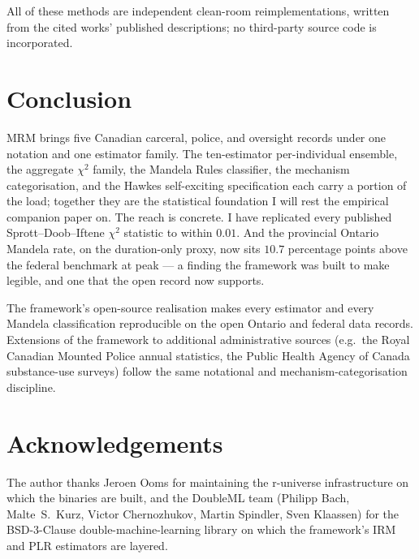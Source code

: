 \documentclass[article,shortnames,nojss]{jss}
\begin{document}
All of these methods are independent clean-room reimplementations,
written from the cited works' published descriptions; no third-party
source code is incorporated.

\section{Conclusion}
\label{sec:conclusion}

MRM brings five Canadian carceral, police, and oversight records
under one notation and one estimator family. The ten-estimator
per-individual ensemble, the aggregate $\chi^{2}$ family, the
Mandela Rules classifier, the mechanism categorisation, and the
Hawkes self-exciting specification each carry a portion of the
load; together they are the statistical foundation I will rest
the empirical companion paper on. The reach is concrete. I
have replicated every published Sprott--Doob--Iftene $\chi^{2}$
statistic to within $0.01$. And the provincial Ontario Mandela
rate, on the duration-only proxy, now sits $10.7$ percentage
points above the federal benchmark at peak --- a finding the
framework was built to make legible, and one that the open
record now supports.

The framework's open-source realisation makes every estimator
and every Mandela classification reproducible on the open
Ontario and federal data records.
Extensions of the framework to additional administrative sources
(e.g.\ the Royal Canadian Mounted Police annual statistics, the
Public Health Agency of Canada substance-use surveys) follow the
same notational and mechanism-categorisation discipline.

\section*{Acknowledgements}

The author thanks Jeroen Ooms for maintaining the r-universe
infrastructure on which the   binaries are built,
and the DoubleML team (Philipp Bach, Malte~S.\ Kurz, Victor
Chernozhukov, Martin Spindler, Sven Klaassen) for the BSD-3-Clause
double-machine-learning library on which the framework's IRM and
PLR estimators are layered.
\end{document}
